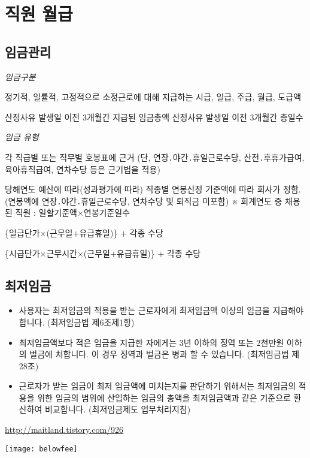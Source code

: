 ﻿\section{직원 월급}
\subsection{임금관리}
\emph{임금구분}
\begin{description}\tightlist
\item[통상임금] 정기적, 일률적, 고정적으로 소정근로에 대해 지급하는 
   시급, 일급, 주급, 월급, 도급액
\item[평균임금] 산정사유 발생일 이전 3개월간 지급된 임금총액
     산정사유 발생일 이전 3개월간 총일수
\end{description}
\emph{임금 유형}
\begin{description}\tightlist
\item[호봉제] 각 직급별 또는 직무별 호봉표에 근거
   (단, 연장․야간․휴일근로수당, 산전․후휴가급여, 육아휴직급여,
    연차수당 등은 근기법을 적용)  

\item[연봉제] 당해연도 예산에 따라(성과평가에 따라) 직종별 연봉산정 기준액에 따라
   회사가 정함.
   (연봉액에 연장․야간․휴일근로수당, 연차수당 및 퇴직금 미포함)
   ※ 회계연도 중 채용된 직원 : 일할기준액×연봉기준일수

\item[일급제] \{일급단가×(근무일+유급휴일)\} + 각종 수당
\item[시급제] \{시급단가×근무시간×(근무일+유급휴일)\} + 각종 수당
\end{description}

\subsection{최저임금}
\par
\begin{itemize}\tightlist
\item 사용자는 최저임금의 적용을 받는 근로자에게 최저임금액 이상의 임금을 지급해야 합니다. (최저임금법 제6조제1항)
\item 최저임금액보다 적은 임금을 지급한 자에게는 3년 이하의 징역 또는 2천만원 이하의 벌금에 처합니다. 이 경우 징역과 벌금은 병과 할 수 있습니다. (최저임금법 제28조)
\item 근로자가 받는 임금이 최저 임금액에 미치는지를 판단하기 위해서는 최저임금의 적용을 위한 임금의 범위에 산입하는 임금의 총액을 최저임금액과 같은 기준으로 환산하여 비교합니다. (최저임금제도 업무처리지침)
\end{itemize}
\url{http://maitland.tistory.com/926}
\par
\medskip

\texttt{[image: belowfee]}
\par
\medskip
